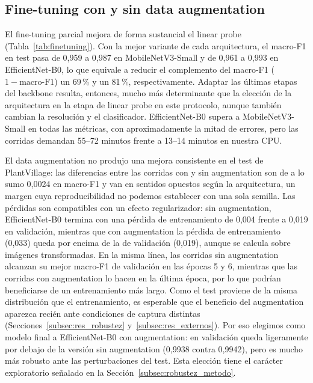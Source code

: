 \subsection{Fine-tuning con y sin data augmentation}
\label{subsec:res_finetuning}
El fine-tuning parcial mejora de forma sustancial el linear probe
(Tabla~\ref{tab:finetuning}). Con la mejor variante de cada arquitectura, el macro-F1 en test
pasa de 0,959 a 0,987 en MobileNetV3-Small y de 0,961 a 0,993 en EfficientNet-B0, lo que
equivale a reducir el complemento del macro-F1 ($1-\text{macro-F1}$) un 69\,\% y un 81\,\%,
respectivamente. Adaptar las últimas etapas del backbone resulta, entonces, mucho más
determinante que la elección de la arquitectura en la etapa de linear probe en este protocolo,
aunque también cambian la resolución y el clasificador. EfficientNet-B0
supera a MobileNetV3-Small en todas las métricas, con aproximadamente la mitad de errores,
pero las corridas demandan 55--72 minutos frente a 13--14 minutos en nuestra CPU.

El data augmentation no produjo una mejora consistente en el test de PlantVillage: las diferencias
entre las corridas con y sin augmentation son de a lo sumo 0,0024 en macro-F1 y van en
sentidos opuestos según la arquitectura, un margen cuya reproducibilidad no podemos establecer con una
sola semilla. Las pérdidas son compatibles con un efecto regularizador: sin augmentation, EfficientNet-B0 termina
con una pérdida de entrenamiento de 0,004 frente a 0,019 en validación, mientras que con augmentation la pérdida de entrenamiento (0,033) queda por
encima de la de validación (0,019), aunque se calcula sobre imágenes transformadas. En la misma línea, las corridas sin augmentation alcanzan
su mejor macro-F1 de validación en las épocas 5 y 6, mientras que las corridas con augmentation
lo hacen en la última época, por lo que podrían beneficiarse de un entrenamiento más largo.
Como el test proviene de la misma distribución que el entrenamiento, es esperable que el
beneficio del augmentation aparezca recién ante condiciones de captura distintas
(Secciones~\ref{subsec:res_robustez} y~\ref{subsec:res_externos}). Por eso elegimos como
modelo final a EfficientNet-B0 con augmentation: en validación queda ligeramente por debajo
de la versión sin augmentation (0,9938 contra 0,9942), pero es mucho más robusto ante las
perturbaciones del test. Esta elección tiene el carácter exploratorio señalado en la
Sección~\ref{subsec:robustez_metodo}.

